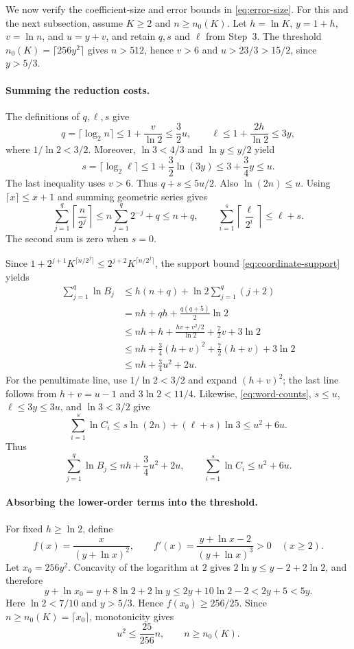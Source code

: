\documentclass[11pt]{article}
\numberwithin{equation}{section}
\theoremstyle{boldremark}\newtheorem{remark}[theorem]{Remark}
\begin{document}
We now verify the coefficient-size and error bounds in
\eqref{eq:error-size}. For this and the next subsection, assume
$K\ge2$ and $n\ge n_0(K)$.
Let $h=\ln K$, $y=1+h$, $v=\ln n$, and $u=y+v$, and retain
$q,s$ and $\ell$ from Step~3. The threshold
$n_0(K)=\lceil256y^2\rceil$ gives $n>512$, hence $v>6$ and
$u>23/3>15/2$, since $y>5/3$.

\paragraph{Summing the reduction costs.}
The definitions of $q,\ell,s$ give
\[
 q=\lceil\log_2n\rceil\le1+\frac v{\ln2}\le\frac32u,
 \qquad
 \ell\le1+\frac{2h}{\ln2}\le3y,
\]
where $1/\ln2<3/2$. Moreover, $\ln3<4/3$ and
$\ln y\le y/2$ yield
\[
 s=\lceil\log_2\ell\rceil
 \le1+\frac32\ln(3y)
 \le3+\frac34y\le u.
\]
The last inequality uses $v>6$. Thus $q+s\le5u/2$.
Also $\ln(2n)\le u$. Using $\lceil x\rceil\le x+1$ and summing
geometric series gives
\[
 \sum_{j=1}^q\left\lceil\frac n{2^j}\right\rceil
 \le n\sum_{j=1}^q2^{-j}+q\le n+q,
 \qquad
 \sum_{i=1}^s\left\lceil\frac\ell{2^i}\right\rceil
 \le\ell+s.
\]
The second sum is zero when $s=0$.

Since $1+2^{j+1}K^{\lceil n/2^j\rceil}
\le2^{j+2}K^{\lceil n/2^j\rceil}$, the support bound
\eqref{eq:coordinate-support} yields
\begin{align*}
 \sum_{j=1}^q\ln B_j
 &\le h(n+q)+\ln2\sum_{j=1}^q(j+2)\\
 &=nh+qh+\frac{q(q+5)}2\ln2\\
 &\le nh+h+\frac{hv+v^2/2}{\ln2}+\frac72v+3\ln2\\
 &\le nh+\frac34(h+v)^2+\frac72(h+v)+3\ln2\\
 &\le nh+\frac34u^2+2u.
\end{align*}
For the penultimate line, use $1/\ln2<3/2$ and expand $(h+v)^2$;
the last line follows from $h+v=u-1$ and $3\ln2<11/4$.
Likewise, \eqref{eq:word-counts}, $s\le u$, $\ell\le3y\le3u$,
and $\ln3<3/2$ give
\[
 \sum_{i=1}^s\ln C_i
 \le s\ln(2n)+(\ell+s)\ln3
 \le u^2+6u.
\]
Thus
\begin{equation}
 \sum_{j=1}^q\ln B_j\le nh+\frac34u^2+2u,\qquad
 \sum_{i=1}^s\ln C_i\le u^2+6u.
 \label{eq:summed-costs}
\end{equation}

\paragraph{Absorbing the lower-order terms into the threshold.}
For fixed $h\ge\ln2$, define
\[
 f(x)=\frac{x}{(y+\ln x)^2},\qquad
 f'(x)=\frac{y+\ln x-2}{(y+\ln x)^3}>0
 \quad(x\ge2).
\]
Let $x_0=256y^2$. Concavity of the logarithm at $2$ gives
$2\ln y\le y-2+2\ln2$, and therefore
\[
 y+\ln x_0
 =y+8\ln2+2\ln y
 \le2y+10\ln2-2<2y+5<5y.
\]
Here $\ln2<7/10$ and $y>5/3$. Hence
$f(x_0)\ge256/25$. Since $n\ge n_0(K)=\lceil x_0\rceil$,
monotonicity gives
\begin{equation}
 u^2\le\frac{25}{256}n,\qquad n\ge n_0(K).
 \label{eq:threshold-absorption}
\end{equation}
\end{document}
